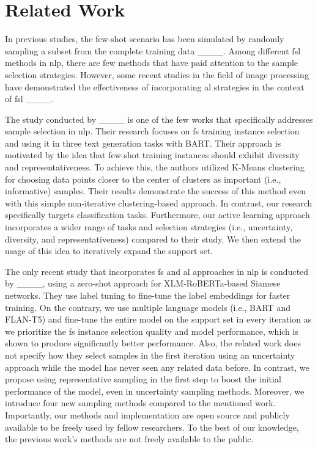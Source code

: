 \section{Related Work}
\label{sec:rel_work_section}

In previous studies, the few-shot scenario has been simulated by randomly sampling a subset from the complete training data ____. Among different \gls*{fsl} methods in \gls*{nlp}, there are few methods that have paid attention to the sample selection strategies.
However, some recent studies in the field of image processing have demonstrated the effectiveness of incorporating \gls*{al} strategies in the context of \gls*{fsl} ____.

The study conducted by ____ is one of the few works that specifically addresses sample selection in \gls*{nlp}.
Their research focuses on \gls*{fs} training instance selection and using it in three text generation tasks with BART.
Their approach is motivated by the idea that few-shot training instances should exhibit diversity and representativeness. To achieve this, the authors utilized K-Means clustering for choosing data points closer to the center of clusters as important (i.e., informative) samples. Their results demonstrate the success of this method even with this simple non-iterative clustering-based approach. 
In contrast, our research specifically targets classification tasks. Furthermore, our active learning approach incorporates a wider range of tasks and selection strategies (i.e., uncertainty, diversity, and representativeness) compared to their study. We then extend the usage of this idea to iteratively expand the support set.

The only recent study that incorporates \gls*{fs} and \gls*{al} approaches in \gls*{nlp} is conducted by ____, using a zero-shot approach for XLM-RoBERTa-based Siamese networks. They use label tuning to fine-tune the label embeddings for faster training.
On the contrary, we use multiple language models (i.e., BART and FLAN-T5) and fine-tune the entire model on the support set in every iteration as we prioritize the \gls*{fs} instance selection quality and model performance, which is shown to produce significantly better performance. Also, the related work does not specify how they select samples in the first iteration using an uncertainty approach while the model has never seen any related data before. In contrast, we propose using representative sampling in the first step to boost the initial performance of the model, even in uncertainty sampling methods. Moreover, we introduce four new sampling methods compared to the mentioned work. Importantly, our methods and implementation are open source and publicly available to be freely used by fellow researchers. To the best of our knowledge, the previous work’s methods are not freely available to the public.